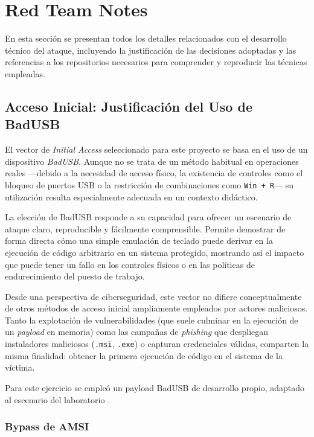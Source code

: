 \chapter{Red Team Notes}

\label{chap:red-team}

En esta sección se presentan todos los detalles relacionados con el desarrollo técnico del ataque, incluyendo la justificación de las decisiones adoptadas y las referencias a los repositorios necesarios para comprender y reproducir las técnicas empleadas.

\section{Acceso Inicial: Justificación del Uso de BadUSB}
\label{sec:bad-usb}

El vector de \textit{Initial Access} seleccionado para este proyecto se basa en el uso de un dispositivo \textit{BadUSB}. Aunque no se trata de un método habitual en operaciones reales —debido a la necesidad de acceso físico, la existencia de controles como el bloqueo de puertos USB o la restricción de combinaciones como \texttt{Win + R}— su utilización resulta especialmente adecuada en un contexto didáctico.

La elección de BadUSB responde a su capacidad para ofrecer un escenario de ataque claro, reproducible y fácilmente comprensible. Permite demostrar de forma directa cómo una simple emulación de teclado puede derivar en la ejecución de código arbitrario en un sistema protegido, mostrando así el impacto que puede tener un fallo en los controles físicos o en las políticas de endurecimiento del puesto de trabajo.

Desde una perspectiva de ciberseguridad, este vector no difiere conceptualmente de otros métodos de acceso inicial ampliamente empleados por actores maliciosos. Tanto la explotación de vulnerabilidades (que suele culminar en la ejecución de un \textit{payload} en memoria) como las campañas de \textit{phishing} que despliegan instaladores maliciosos (\texttt{.msi}, \texttt{.exe}) o capturan credenciales válidas, comparten la misma finalidad: obtener la primera ejecución de código en el sistema de la víctima.

Para este ejercicio se empleó un payload BadUSB de desarrollo propio, adaptado al escenario del laboratorio \cite{badusb-payload}.

\subsection{Bypass de AMSI}

